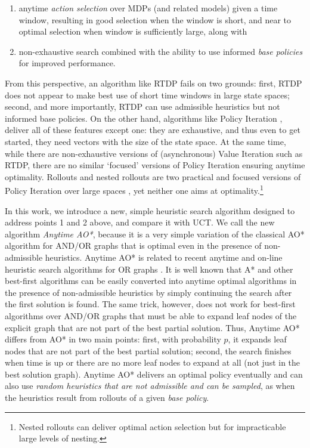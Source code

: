 \documentclass[letterpaper]{article}
\begin{document}
\begin{enumerate}[1.]
\item {anytime} \emph{action selection} over MDPs (and related models) given a time window, resulting in
good selection when the window is short, and  near to optimal selection when window is sufficiently large, along with
\item non-exhaustive  search combined with the ability to  use  informed \emph{base policies} for improved performance.
\end{enumerate} From this perspective, an algorithm like RTDP fails on two grounds: first, RTDP does not
appear to make best use of short time windows in large state spaces;  second, and more importantly,
RTDP  can use admissible heuristics but not informed base policies.  On the other hand, algorithms
like Policy Iteration \cite{howard:pi}, deliver all of these features except one: they are exhaustive, and thus even to get started,
they need vectors  with the size of the state space. At the same time, while there are non-exhaustive versions
of (asynchronous) Value Iteration such as RTDP, there are no similar `focused' versions of Policy Iteration
ensuring  anytime optimality. Rollouts and nested rollouts are two practical and focused versions of Policy  Iteration
over large spaces \cite{bertsekas:rollouts,diaconis:nested}, yet neither one aims at optimality.\footnote{
Nested rollouts can deliver optimal action selection  but for impracticable large levels of nesting.}

In this work, we  introduce a new, simple heuristic search algorithm designed to  address points  1 and 2 above,
and compare it with UCT. We call the new algorithm \emph{Anytime AO*}, because it is a
very simple variation of the classical AO* algorithm for  AND/OR graphs \cite{nilsson:book}
that is optimal even
in the presence of non-admissible heuristics. Anytime AO* is related  to recent
anytime and on-line heuristic search algorithms for OR graphs \cite{likhachev:ara,hansen:anytime,koenig:2009,thayer-ruml:anytime}.
It is well known that A* and other best-first algorithms can be  easily converted into anytime optimal algorithms
in the presence of non-admissible heuristics by simply continuing  the search after the first solution is found. The same trick, however,
does not work for  best-first algorithms over AND/OR graphs that must be able to expand leaf nodes of
the explicit graph that are not part of the best partial solution.
Thus, Anytime AO* differs from AO* in two main points: first, with probability $p$,
it expands leaf nodes that are not part of the best partial solution; second,
the search finishes when time is up or there are no more leaf nodes to expand at all
(not just in the best solution graph). Anytime AO*  delivers an optimal policy eventually
and can also use \emph{random heuristics that are not admissible and can be sampled},
as when the heuristics result from rollouts of a given \emph{base policy}.
\end{document}
